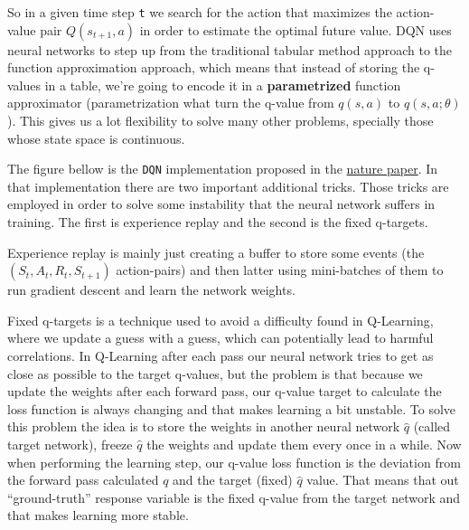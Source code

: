 \documentclass[
]{article}
\begin{document}
So in a given time step \texttt{t} we search for the action that
maximizes the action-value pair \(Q(s_{t+1},a)\) in order to estimate
the optimal future value. DQN uses neural networks to step up from the
traditional tabular method approach to the function approximation
approach, which means that instead of storing the q-values in a table,
we're going to encode it in a \textbf{parametrized} function
approximator (parametrization what turn the q-value from \(q(s,a)\) to
\(q(s,a;\theta)\)). This gives us a lot flexibility to solve many other
problems, specially those whose state space is continuous.

The figure bellow is the \texttt{DQN} implementation proposed in the
\href{https://storage.googleapis.com/deepmind-media/dqn/DQNNaturePaper.pdf}{nature
paper}. In that implementation there are two important additional
tricks. Those tricks are employed in order to solve some instability
that the neural network suffers in training. The first is experience
replay and the second is the fixed q-targets.

Experience replay is mainly just creating a buffer to store some events
(the \((S_{t},A_{t},R_{t},S_{t+1})\) action-pairs) and then latter using
mini-batches of them to run gradient descent and learn the network
weights.

Fixed q-targets is a technique used to avoid a difficulty found in
Q-Learning, where we update a guess with a guess, which can potentially
lead to harmful correlations. In Q-Learning after each pass our neural
network tries to get as close as possible to the target q-values, but
the problem is that because we update the weights after each forward
pass, our q-value target to calculate the loss function is always
changing and that makes learning a bit unstable. To solve this problem
the idea is to store the weights in another neural network \(\hat{q}\)
(called target network), freeze \(\hat{q}\) the weights and update them
every once in a while. Now when performing the learning step, our
q-value loss function is the deviation from the forward pass calculated
\(q\) and the target (fixed) \(\hat{q}\) value. That means that out
``ground-truth'' response variable is the fixed q-value from the target
network and that makes learning more stable.
\end{document}

